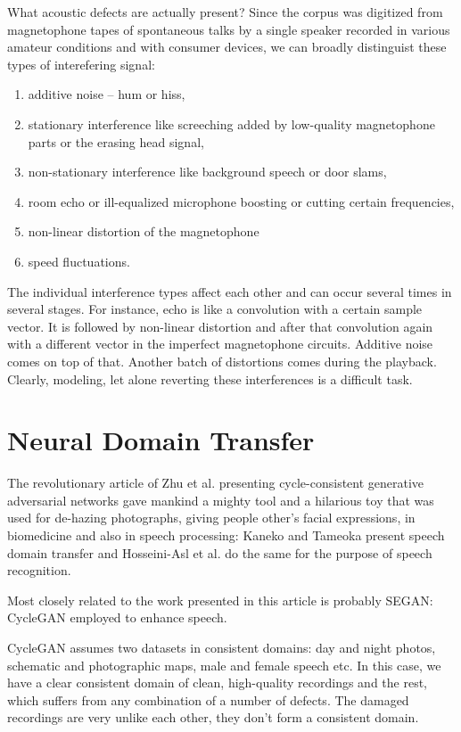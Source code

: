 \documentclass[runningheads,a4paper]{llncs}
\begin{document}
What acoustic defects are actually present? Since the corpus was digitized from
magnetophone tapes of spontaneous talks by a single speaker recorded in various
amateur conditions and with consumer devices, we can broadly distinguist these
types of interefering signal:
\begin{enumerate}
\item{additive noise -- hum or hiss,}
\item{
    stationary interference like screeching added by low-quality magnetophone
    parts or the erasing head signal,
}
\item{non-stationary interference like background speech or door slams,}
\item{
    room echo or ill-equalized microphone boosting or cutting certain
    frequencies,
}
\item{non-linear distortion of the magnetophone}
\item{speed fluctuations.}
\end{enumerate}

The individual interference types affect each other and can occur several times
in several stages. For instance, echo is like a convolution with a certain
sample vector. It is followed by non-linear distortion and after that
convolution again with a different vector in the imperfect magnetophone
circuits. Additive noise comes on top of that. Another batch of distortions
comes during the playback. Clearly, modeling, let alone reverting these
interferences is a difficult task.

\section{Neural Domain Transfer}

The revolutionary article of Zhu et al.\cite{cyclegan} presenting
cycle-consistent generative adversarial networks gave mankind a mighty tool and
a hilarious toy that was used for de-hazing
photographs\cite{Engin_2018_CVPR_Workshops}, giving people other's facial
expressions\cite{jin2017faceoff}, in biomedicine\cite{yang2018biogan} and also
in speech processing: Kaneko and Tameoka\cite{kaneko2017parallel} present
speech domain transfer and Hosseini-Asl et al.\cite{hosseini2018malevoicegan} do
the same for the purpose of speech recognition.


Most closely related to the work presented in this article is probably
SEGAN\cite{pascual2017segan}: CycleGAN employed to enhance speech.

CycleGAN assumes two datasets in consistent domains: day and night photos,
schematic and photographic maps, male and female speech etc. In this case,
we have a clear consistent domain of clean, high-quality recordings and the
rest, which suffers from any combination of a number of defects. The damaged
recordings are very unlike each other, they don't form a consistent domain.
\end{document}
